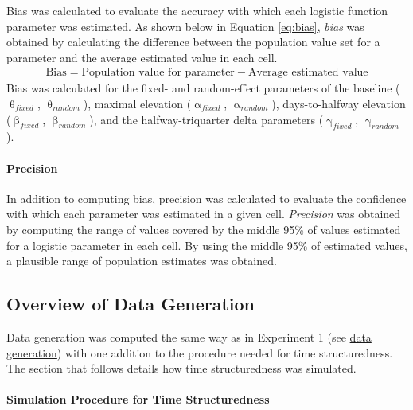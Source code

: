 \documentclass[
12pt, %
twoside,
english]{guelphthesis}
\theoremstyle{definition}
\theoremstyle{definition}
\theoremstyle{definition}
\theoremstyle{definition}
\theoremstyle{remark}
\begin{document}
Bias was calculated to evaluate the accuracy with which each logistic
function parameter was estimated. As shown below in Equation
\eqref{eq:bias}, \emph{bias} was obtained by calculating the difference
between the population value set for a parameter and the average
estimated value in each cell.
\begin{align}
  \text{Bias} =  \text{Population value for parameter} - \text{Average estimated value}
  \label{eq:bias} 
\end{align}
\noindent Bias was calculated for the fixed- and random-effect parameters of the baseline (\(\uptheta_{fixed}\), \(\uptheta_{random}\)), maximal elevation (\(\upalpha_{fixed}\), \(\upalpha_{random}\)), days-to-halfway elevation (\(\upbeta_{fixed}\), \(\upbeta_{random}\)), and the halfway-triquarter delta parameters (\(\upgamma_{fixed}\), \(\upgamma_{random}\)).

\hypertarget{precision-1}{%
\paragraph{Precision}\label{precision-1}}

In addition to computing bias, precision was calculated to evaluate the confidence with which each parameter was estimated in a given cell. \emph{Precision} was obtained by computing the range of values covered by the middle 95\% of values estimated for a logistic parameter in each cell. By using the middle 95\% of estimated values, a plausible range of population estimates was obtained.

\hypertarget{overview-of-data-generation-1}{%
\subsection{Overview of Data Generation}\label{overview-of-data-generation-1}}

Data generation was computed the same way as in Experiment 1 (see \protect\hyperlink{data-generation}{data generation}) with one addition to the procedure needed for time structuredness. The section that follows details how time structuredness was simulated.

\hypertarget{simulation-procedure-for-time-structuredness}{%
\paragraph{Simulation Procedure for Time Structuredness}\label{simulation-procedure-for-time-structuredness}}
\end{document}

